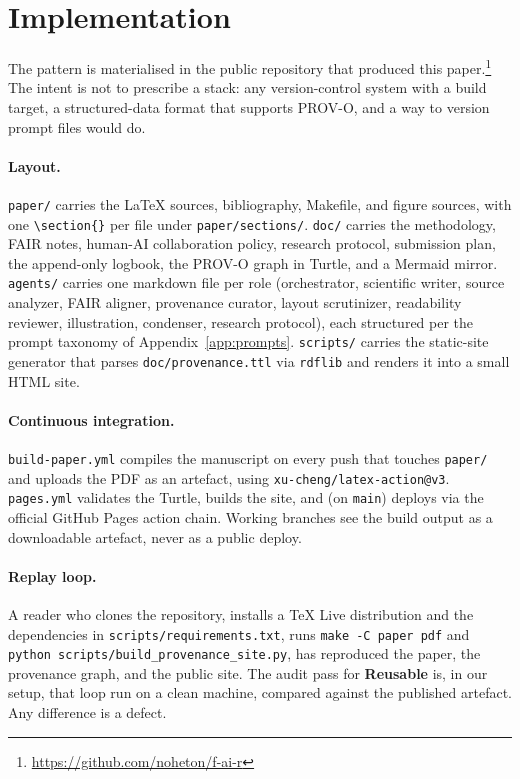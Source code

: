 \section{Implementation}
\label{sec:impl}

The pattern is materialised in the public repository that produced
this paper.\footnote{\url{https://github.com/noheton/f-ai-r}} The
intent is not to prescribe a stack: any version-control system with
a build target, a structured-data format that supports PROV-O, and a
way to version prompt files would do.

\paragraph{Layout.}
\texttt{paper/} carries the \LaTeX{} sources, bibliography, Makefile,
and figure sources, with one \texttt{\textbackslash section\{\}}
per file under \texttt{paper/sections/}. \texttt{doc/} carries the
methodology, FAIR notes, human-AI collaboration policy, research
protocol, submission plan, the append-only logbook, the PROV-O graph
in Turtle, and a Mermaid mirror. \texttt{agents/} carries one
markdown file per role (orchestrator, scientific writer, source
analyzer, FAIR aligner, provenance curator, layout scrutinizer,
readability reviewer, illustration, condenser, research protocol),
each structured per the prompt taxonomy of
Appendix~\ref{app:prompts}. \texttt{scripts/} carries the static-site
generator that parses \texttt{doc/provenance.ttl} via \texttt{rdflib}
and renders it into a small HTML site.

\paragraph{Continuous integration.}
\texttt{build-paper.yml} compiles the manuscript on every push that
touches \texttt{paper/} and uploads the PDF as an artefact, using
\texttt{xu-cheng/latex-action@v3}. \texttt{pages.yml} validates the
Turtle, builds the site, and (on \texttt{main}) deploys via the
official GitHub Pages action chain. Working branches see the build
output as a downloadable artefact, never as a public deploy.

\paragraph{Replay loop.}
A reader who clones the repository, installs a TeX Live distribution
and the dependencies in \texttt{scripts/requirements.txt}, runs
\texttt{make -C paper pdf} and
\texttt{python scripts/build\_provenance\_site.py}, has reproduced
the paper, the provenance graph, and the public site. The audit pass
for \textbf{Reusable} is, in our setup, that loop run on a clean
machine, compared against the published artefact. Any difference is
a defect.
